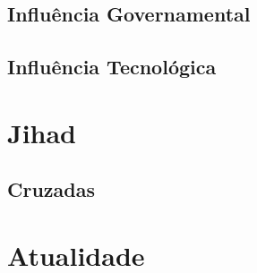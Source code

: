 \documentclass{beamer}
\begin{document}
\subsection{ Influência Governamental }

\subsection{ Influência Tecnológica }
\section{Jihad}
\subsection{ Cruzadas }
\section{Atualidade}
\end{document}
